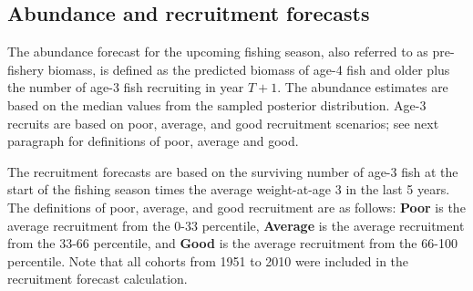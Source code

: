 	\subsection{Abundance and recruitment forecasts}
	The abundance forecast for the upcoming fishing season, also referred to as pre-fishery biomass, is defined as the predicted biomass of age-4 fish and older plus the number of age-3 fish recruiting in year $T+1$.  The abundance estimates are based on the median values from the sampled posterior distribution.  Age-3 recruits are based on poor, average, and good recruitment scenarios; see next paragraph for definitions of poor, average and good.
	
	The recruitment forecasts are based on the surviving number of age-3 fish at the start of the fishing season times the average weight-at-age 3 in the last 5 years. The definitions of poor, average, and good recruitment are as follows: \textbf{Poor} is the average recruitment from the 0-33 percentile, \textbf{Average} is the average recruitment from the 33-66 percentile, and \textbf{Good} is the average recruitment from the 66-100 percentile.  Note that all cohorts from 1951 to 2010  were included in the recruitment forecast calculation.	

	
	
